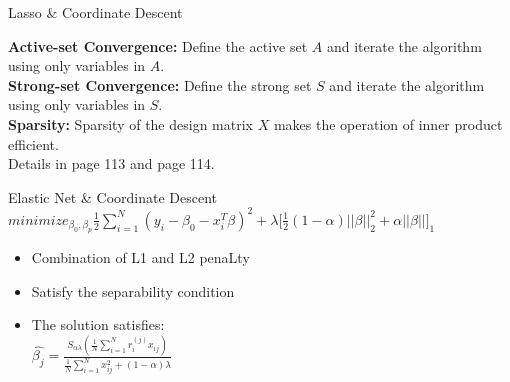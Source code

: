 \documentclass{beamer}
\begin{document}
\begin{frame}{Lasso \& Coordinate Descent }

\textbf{Active-set Convergence:} Define the
active set $A$ and iterate the algorithm using only  variables in $A$.\\
\vspace*{3mm}
\textbf{Strong-set Convergence:}  Define the strong set $S$ and iterate the algorithm using only variables in $S$.\\
\vspace*{3mm}
\textbf{Sparsity:} Sparsity of the design matrix $X$ makes the operation of inner product efficient.\\
\vspace*{3mm}
Details in page 113 and page 114. 

\end{frame}

\begin{frame}{Elastic Net \& Coordinate Descent}
\(minimize_{\beta_0,\beta_p}\frac{1}{2}\sum_{i=1}^{N}(y_{i}-\beta_{0}-x_i^{T}\beta)^2+\lambda \big[\frac{1}{2}(1-\alpha)\lvert\lvert\beta\rvert\rvert_2^2 + \alpha\lvert\lvert\beta \rvert\rvert\big]_1\)
\vspace*{4mm}
\begin{itemize}
    \item Combination of L1 and L2 penaLty 
   \vspace*{3mm}
    \item Satisfy the separability condition
    \vspace*{3mm}
    \item The solution satisfies:\\
    \vspace*{3mm}
    \(\hat{\beta_j}=\frac{S_{\alpha\lambda}(\frac{1}{N}\sum_{i=1}^{N}r_i^{(j)} x_{ij} )}{\frac{1}{N}\sum_{i=1}^{N}x_{ij}^2+(1-\alpha)\lambda}\)\\
\end{itemize}



\end{frame}
\end{document}
